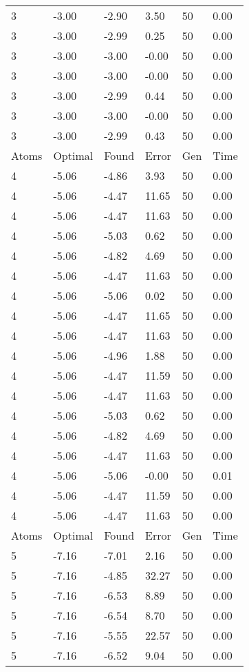 \documentclass{report}
\begin{document}
\begin{appendix}
\begin{longtable}{llllll}
3 & -3.00 & -2.90 & 3.50 & 50 & 0.00 \\
3 & -3.00 & -2.99 & 0.25 & 50 & 0.00 \\
3 & -3.00 & -3.00 & -0.00 & 50 & 0.00 \\
3 & -3.00 & -3.00 & -0.00 & 50 & 0.00 \\
3 & -3.00 & -2.99 & 0.44 & 50 & 0.00 \\
3 & -3.00 & -3.00 & -0.00 & 50 & 0.00 \\
3 & -3.00 & -2.99 & 0.43 & 50 & 0.00 \\
Atoms & Optimal & Found & Error & Gen & Time \\
4 & -5.06 & -4.86 & 3.93 & 50 & 0.00 \\
4 & -5.06 & -4.47 & 11.65 & 50 & 0.00 \\
4 & -5.06 & -4.47 & 11.63 & 50 & 0.00 \\
4 & -5.06 & -5.03 & 0.62 & 50 & 0.00 \\
4 & -5.06 & -4.82 & 4.69 & 50 & 0.00 \\
4 & -5.06 & -4.47 & 11.63 & 50 & 0.00 \\
4 & -5.06 & -5.06 & 0.02 & 50 & 0.00 \\
4 & -5.06 & -4.47 & 11.65 & 50 & 0.00 \\
4 & -5.06 & -4.47 & 11.63 & 50 & 0.00 \\
4 & -5.06 & -4.96 & 1.88 & 50 & 0.00 \\
4 & -5.06 & -4.47 & 11.59 & 50 & 0.00 \\
4 & -5.06 & -4.47 & 11.63 & 50 & 0.00 \\
4 & -5.06 & -5.03 & 0.62 & 50 & 0.00 \\
4 & -5.06 & -4.82 & 4.69 & 50 & 0.00 \\
4 & -5.06 & -4.47 & 11.63 & 50 & 0.00 \\
4 & -5.06 & -5.06 & -0.00 & 50 & 0.01 \\
4 & -5.06 & -4.47 & 11.59 & 50 & 0.00 \\
4 & -5.06 & -4.47 & 11.63 & 50 & 0.00 \\
Atoms & Optimal & Found & Error & Gen & Time \\
5 & -7.16 & -7.01 & 2.16 & 50 & 0.00 \\
5 & -7.16 & -4.85 & 32.27 & 50 & 0.00 \\
5 & -7.16 & -6.53 & 8.89 & 50 & 0.00 \\
5 & -7.16 & -6.54 & 8.70 & 50 & 0.00 \\
5 & -7.16 & -5.55 & 22.57 & 50 & 0.00 \\
5 & -7.16 & -6.52 & 9.04 & 50 & 0.00 \\

\end{longtable}
\end{appendix}
\end{document}
